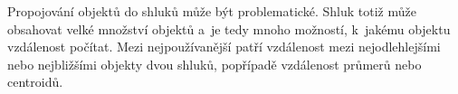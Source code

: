 \begin{description}
Propojování objektů do shluků může být problematické. Shluk totiž může obsahovat velké množství objektů a~je tedy mnoho možností, k~jakému objektu vzdálenost počítat. Mezi nejpoužívanější patří  vzdálenost mezi nejodlehlejšími nebo nejbližšími objekty dvou shluků, popřípadě vzdálenost průmerů nebo centroidů. %



\end{description}
